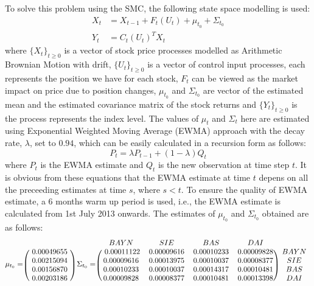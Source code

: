 To solve this problem using the SMC,  the following state space modelling is used:
\begin{align}
  X_t &= X_{t-1} + F_t(U_t) + \mu_{t_0} + \Sigma_{t_0} \\
  Y_t &= C_t(U_t)^{T}X_t
\end{align}
where $\{X_t\}_{t \geq 0}$ is a vector of stock price processes modelled as Arithmetic Brownian Motion with drift, $\{U_t\}_{t \geq 0}$ is a vector of control input processes, each represents the position we have for each stock, $F_t$ can be viewed as the market impact on price due to position changes, $\mu_{t_0}$ and $\Sigma_{t_0}$ are vector of the estimated mean and the estimated covariance matrix of the stock returns and $\{Y_t\}_{t \geq 0}$ is the process represents the index level. The values of $\mu_t$ and $\Sigma_t$ here are estimated using Exponential Weighted Moving Average (EWMA) approach with the decay rate, $\lambda$, set to $0.94$, which can be easily calculated in a recursion form as follows:
\begin{equation}
  P_t = \lambda P_{t-1} + (1-\lambda) Q_{t}
\end{equation}
where $P_t$ is the EWMA estimate and $Q_t$ is the new observation at time step $t$. It is obvious from these equations that the EWMA estimate at time $t$ depens on all the preceeding estimates at time $s$, where $s < t$. To ensure the quality of EWMA estimate, a 6 months warm up period is used, i.e., the EWMA estimate is calculated from 1st July 2013 onwards. The estimates of $\mu_{t_0}$ and $\Sigma_{t_0}$ obtained are as follows:
\begin{equation}
\mu_{t_0} =
\begin{blockarray}{c}
\\
\begin{block}{(c)}
~ 0.00049655 ~ \\
0.00215094 \\
0.00156870 \\
0.00203186 \\
\end{block}
\end{blockarray}
~\Sigma_{t_0} =
\begin{blockarray}{ccccc}
  BAYN & SIE & BAS & DAI & \\
\begin{block}{(cccc)c}
 ~ 0.00011122 & 0.00009616 & 0.00010233 & 0.00009828 ~ & BAYN \\
0.00009616 & 0.00013975 & 0.00010037 & 0.00008377 ~ & SIE \\
0.00010233 & 0.00010037 & 0.00014317 & 0.00010481 & BAS \\
0.00009828 & 0.00008377 & 0.00010481 & 0.00013398 & DAI \\
\end{block}
\end{blockarray}
\end{equation}
 
